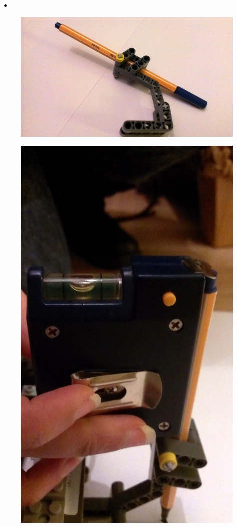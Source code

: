 \documentclass{scrartcl}
\begin{document}
\begin{itemize}
\item
\end{itemize}

\begin{figure}
\centering
\begin{minipage}{.5\textwidth}
  \centering
  \includegraphics[width=.5\linewidth]{img/pen.jpg}
  \label{fig:pen}
\end{minipage}%
\begin{minipage}{.5\textwidth}
  \centering
  \includegraphics[width=.5\linewidth]{img/pen_adjust.jpg}
  \label{fig:pen_calib}
\end{minipage}
\end{figure}
\end{document}
